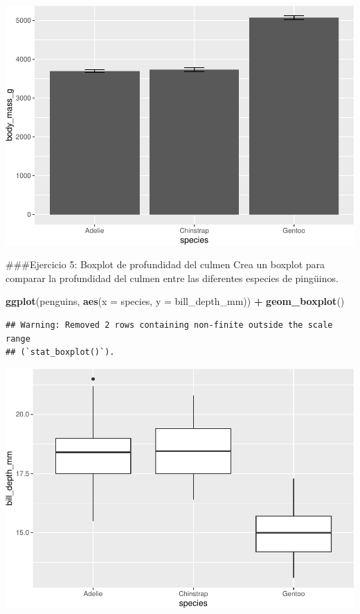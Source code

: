 \documentclass[
]{book}
\newenvironment{Shaded}{\begin{snugshade}}{\end{snugshade}}
\newcommand{\AttributeTok}[1]{\textcolor[rgb]{0.13,0.29,0.53}{#1}}
\newcommand{\FunctionTok}[1]{\textcolor[rgb]{0.13,0.29,0.53}{\textbf{#1}}}
\newcommand{\NormalTok}[1]{#1}
\newcommand{\SpecialCharTok}[1]{\textcolor[rgb]{0.81,0.36,0.00}{\textbf{#1}}}
\begin{document}
\includegraphics{bookdown-demo_files/figure-latex/unnamed-chunk-203-1.pdf}

\#\#\#Ejercicio 5: Boxplot de profundidad del culmen
Crea un boxplot para comparar la profundidad del culmen entre las diferentes especies de pingüinos.

\begin{Shaded}
\begin{Highlighting}[]
\FunctionTok{ggplot}\NormalTok{(penguins, }\FunctionTok{aes}\NormalTok{(}\AttributeTok{x =}\NormalTok{ species, }\AttributeTok{y =}\NormalTok{ bill\_depth\_mm)) }\SpecialCharTok{+}
  \FunctionTok{geom\_boxplot}\NormalTok{()}
\end{Highlighting}
\end{Shaded}

\begin{verbatim}
## Warning: Removed 2 rows containing non-finite outside the scale range
## (`stat_boxplot()`).
\end{verbatim}

\includegraphics{bookdown-demo_files/figure-latex/unnamed-chunk-204-1.pdf}
\end{document}
